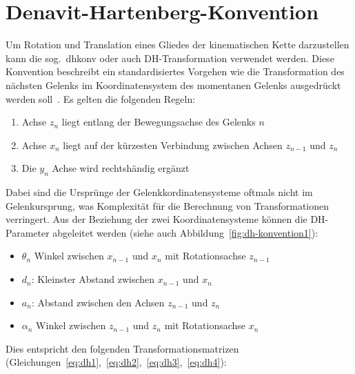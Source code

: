 \section{Denavit-Hartenberg-Konvention}\label{sec:dh-konvention}

Um Rotation und Translation eines Gliedes der kinematischen Kette darzustellen kann die sog.\ \acf{dhkonv} oder auch DH-Transformation verwendet werden.
Diese Konvention beschreibt ein standardisiertes Vorgehen wie die Transformation des nächsten Gelenks im Koordinatensystem des momentanen Gelenks ausgedrückt werden soll~\cite{denavitKinematicNotationLowerPair1955,craigIntroductionRoboticsMechanics2009}.
Es gelten die folgenden Regeln:

\begin{enumerate}
    \item Achse $z_{n}$ liegt entlang der Bewegungsachse des Gelenks $n$
    \item Achse $x_{n}$ liegt auf der kürzesten Verbindung zwischen Achsen $z_{n-1}$ und $z_{n}$
    \item Die $y_{n}$ Achse wird rechtshändig ergänzt
\end{enumerate}

Dabei sind die Ursprünge der Gelenkkordinatensysteme oftmals nicht im Gelenkursprung, was Komplexität für die Berechnung von Transformationen verringert.
Aus der Beziehung der zwei Koordinatensysteme können die DH-Parameter abgeleitet werden (siehe auch Abbildung~\ref{fig:dh-konvention1}):

\begin{itemize}
    \item $\theta_n$ Winkel zwischen $x_{n-1}$ und $x_n$ mit Rotationsachse $z_{n-1}$
    \item $d_n$: Kleinster Abstand zwischen $x_{n-1}$ und $x_n$
    \item $a_n$: Abstand zwischen den Achsen $z_{n-1}$ und $z_n$
    \item $\alpha_n$ Winkel zwischen $z_{n-1}$ und $z_n$ mit Rotationsachse $x_{n}$
\end{itemize}

Dies entspricht den folgenden Transformationsmatrizen (Gleichungen~\ref{eq:dh1},~\ref{eq:dh2},~\ref{eq:dh3},~\ref{eq:dh4}):

\newcommand{\ct}{\cos(\theta_n)}
\newcommand{\st}{\sin(\theta_n)}
\newcommand{\ca}{\cos(\alpha_n)}
\newcommand{\sa}{\sin(\alpha_n)}

